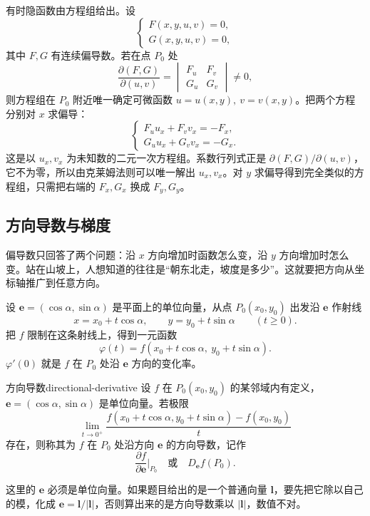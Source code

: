 有时隐函数由方程组给出。设
\[
    \begin{cases}
        F(x,y,u,v)=0,\\
        G(x,y,u,v)=0,
    \end{cases}
\]
其中 \(F,G\) 有连续偏导数。若在点 \(P_0\) 处
\[
    \frac{\partial(F,G)}{\partial(u,v)}
    =\begin{vmatrix}
        F_u & F_v\\
        G_u & G_v
    \end{vmatrix}\neq0,
\]
则方程组在 \(P_0\) 附近唯一确定可微函数 \(u=u(x,y),\ v=v(x,y)\)。把两个方程分别对 \(x\) 求偏导：
\[
    \begin{cases}
        F_u u_x+F_v v_x=-F_x,\\
        G_u u_x+G_v v_x=-G_x.
    \end{cases}
\]
这是以 \(u_x,v_x\) 为未知数的二元一次方程组。系数行列式正是 \(\partial(F,G)/\partial(u,v)\)，它不为零，所以由克莱姆法则可以唯一解出 \(u_x,v_x\)。对 \(y\) 求偏导得到完全类似的方程组，只需把右端的 \(F_x,G_x\) 换成 \(F_y,G_y\)。

\subsection{方向导数与梯度}

偏导数只回答了两个问题：沿 \(x\) 方向增加时函数怎么变，沿 \(y\) 方向增加时怎么变。站在山坡上，人想知道的往往是“朝东北走，坡度是多少”。这就要把方向从坐标轴推广到任意方向。

设 \(\mathbf e=(\cos\alpha,\sin\alpha)\) 是平面上的单位向量，从点 \(P_0(x_0,y_0)\) 出发沿 \(\mathbf e\) 作射线
\[
    x=x_0+t\cos\alpha,\qquad y=y_0+t\sin\alpha\qquad(t\ge0).
\]
把 \(f\) 限制在这条射线上，得到一元函数
\[
    \varphi(t)=f(x_0+t\cos\alpha,\ y_0+t\sin\alpha).
\]
\(\varphi'(0)\) 就是 \(f\) 在 \(P_0\) 处沿 \(\mathbf e\) 方向的变化率。

\begin{mydef}{方向导数}{directional-derivative}
    设 \(f\) 在 \(P_0(x_0,y_0)\) 的某邻域内有定义，\(\mathbf e=(\cos\alpha,\sin\alpha)\) 是单位向量。若极限
    \[
        \lim_{t\to0^+}
        \frac{f(x_0+t\cos\alpha,y_0+t\sin\alpha)-f(x_0,y_0)}{t}
    \]
    存在，则称其为 \(f\) 在 \(P_0\) 处沿方向 \(\mathbf e\) 的方向导数，记作
    \[
        \frac{\partial f}{\partial \mathbf e}\Big|_{P_0}
        \quad\text{或}\quad
        D_{\mathbf e}f(P_0).
    \]
\end{mydef}

这里的 \(\mathbf e\) 必须是单位向量。如果题目给出的是一个普通向量 \(\mathbf l\)，要先把它除以自己的模，化成 \(\mathbf e=\mathbf l/\lvert\mathbf l\rvert\)，否则算出来的是方向导数乘以 \(\lvert\mathbf l\rvert\)，数值不对。

